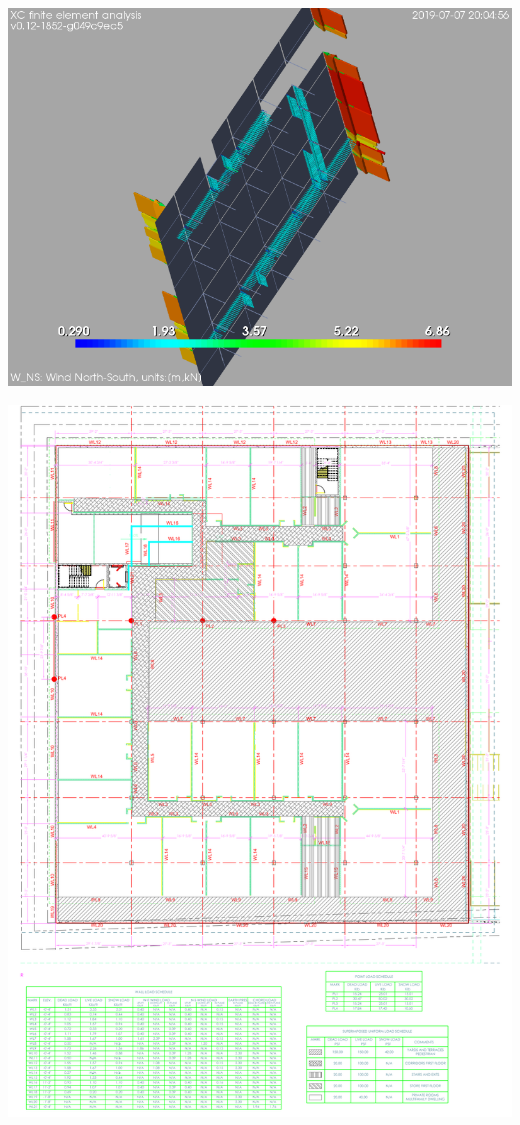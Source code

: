 \begin{Figure}
    \includegraphics[width=\linewidth]{figures/LC_W_NS}
    \label{LC_W_NS}
\end{Figure}
\onecolumn
\begin{Figure}
    \includegraphics[width=150mm]{figures/loads_layout}
    \label{loadLay}
\end{Figure}
